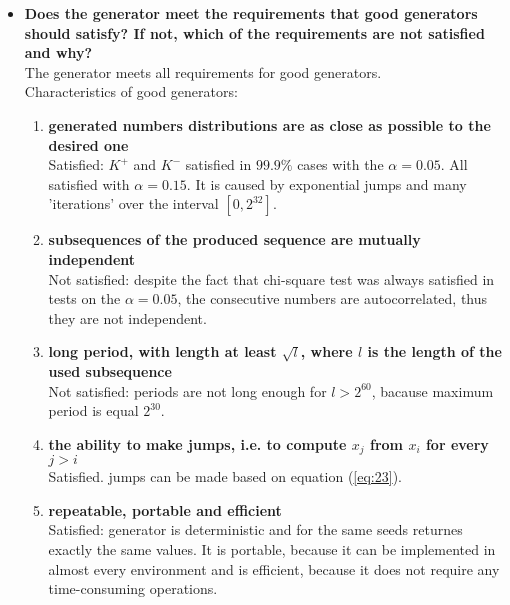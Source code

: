 \documentclass[a4paper,10pt]{article}
\begin{document}
\begin{itemize}
 \item \textbf{Does the generator meet the requirements that good generators should satisfy? If not, which of the requirements are not satisfied and why?} \\
  The generator meets all requirements for good generators. \\
  Characteristics of good generators:
   \begin{enumerate}
    \item \textbf{generated numbers distributions are as close as possible to the desired one} \\
    Satisfied: $K^+$ and $K^-$ satisfied in $99.9\%$ cases with the $\alpha = 0.05$. All satisfied with $\alpha = 0.15$. It is caused by exponential jumps and many 'iterations' over the interval $[0,2^{32}]$.
    \item \textbf{subsequences of the produced sequence are mutually independent} \\
    Not satisfied: despite the fact that chi-square test was always satisfied in tests on the $\alpha = 0.05$, the consecutive numbers are autocorrelated, thus they are not independent.
    \item \textbf{long period, with length at least $\sqrt{l}$, where $l$ is the length of the used subsequence} \\
    Not satisfied: periods are not long enough for $l>2^{60}$, bacause maximum period is equal $2^{30}$.
    \item \textbf{the ability to make jumps, i.e. to compute $x_j$ from $x_i$ for every $j > i$} \\ 
    Satisfied. jumps can be made based on equation (\ref{eq:23}).
    \item \textbf{repeatable, portable and efficient} \\
    Satisfied: generator is deterministic and for the same seeds returnes exactly the same values. It is portable, because it can be implemented in almost every environment and is efficient, because it does not require any time-consuming operations.   
   \end{enumerate}
 

\end{itemize}
\end{document}
